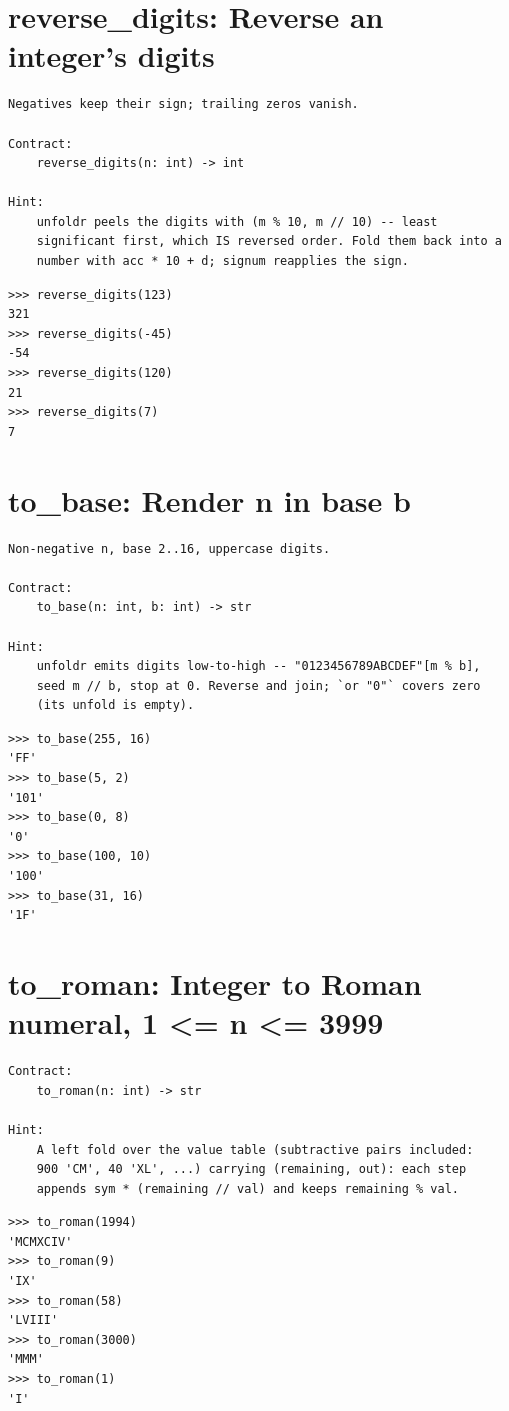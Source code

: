 \documentclass[10pt,letterpaper]{book}
\begin{document}
\section{reverse\_digits: Reverse an integer's digits}
\begin{lstlisting}[style=ex]
Negatives keep their sign; trailing zeros vanish.

Contract:
    reverse_digits(n: int) -> int

Hint:
    unfoldr peels the digits with (m % 10, m // 10) -- least
    significant first, which IS reversed order. Fold them back into a
    number with acc * 10 + d; signum reapplies the sign.
\end{lstlisting}
\begin{lstlisting}[style=ex]
>>> reverse_digits(123)
321
>>> reverse_digits(-45)
-54
>>> reverse_digits(120)
21
>>> reverse_digits(7)
7
\end{lstlisting}

\section{to\_base: Render n in base b}
\begin{lstlisting}[style=ex]
Non-negative n, base 2..16, uppercase digits.

Contract:
    to_base(n: int, b: int) -> str

Hint:
    unfoldr emits digits low-to-high -- "0123456789ABCDEF"[m % b],
    seed m // b, stop at 0. Reverse and join; `or "0"` covers zero
    (its unfold is empty).
\end{lstlisting}
\begin{lstlisting}[style=ex]
>>> to_base(255, 16)
'FF'
>>> to_base(5, 2)
'101'
>>> to_base(0, 8)
'0'
>>> to_base(100, 10)
'100'
>>> to_base(31, 16)
'1F'
\end{lstlisting}

\section{to\_roman: Integer to Roman numeral, 1 <= n <= 3999}
\begin{lstlisting}[style=ex]
Contract:
    to_roman(n: int) -> str

Hint:
    A left fold over the value table (subtractive pairs included:
    900 'CM', 40 'XL', ...) carrying (remaining, out): each step
    appends sym * (remaining // val) and keeps remaining % val.
\end{lstlisting}
\begin{lstlisting}[style=ex]
>>> to_roman(1994)
'MCMXCIV'
>>> to_roman(9)
'IX'
>>> to_roman(58)
'LVIII'
>>> to_roman(3000)
'MMM'
>>> to_roman(1)
'I'
\end{lstlisting}
\end{document}
